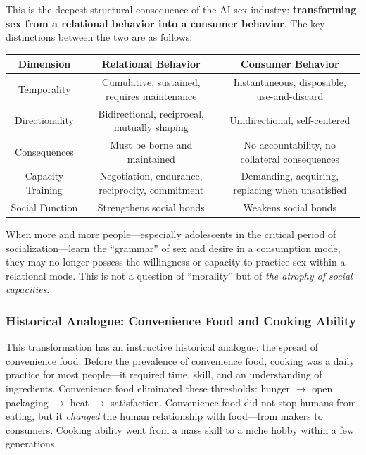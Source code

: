 ﻿\documentclass[12pt,a4paper]{article}
\begin{document}
This is the deepest structural consequence of the AI sex industry: \textbf{transforming sex from a relational behavior into a consumer behavior}. The key distinctions between the two are as follows:

\begin{center}
\begin{tabular}{c|c|c}
\hline
\textbf{Dimension} & \textbf{Relational Behavior} & \textbf{Consumer Behavior} \\
\hline
Temporality & Cumulative, sustained, requires maintenance & Instantaneous, disposable, use-and-discard \\
Directionality & Bidirectional, reciprocal, mutually shaping & Unidirectional, self-centered \\
Consequences & Must be borne and maintained & No accountability, no collateral consequences \\
Capacity Training & Negotiation, endurance, reciprocity, commitment & Demanding, acquiring, replacing when unsatisfied \\
Social Function & Strengthens social bonds & Weakens social bonds \\
\hline
\end{tabular}
\end{center}

When more and more people---especially adolescents in the critical period of socialization---learn the ``grammar'' of sex and desire in a consumption mode, they may no longer possess the willingness or capacity to practice sex within a relational mode. This is not a question of ``morality'' but of \textit{the atrophy of social capacities}.

\subsubsection{Historical Analogue: Convenience Food and Cooking Ability}

This transformation has an instructive historical analogue: the spread of convenience food. Before the prevalence of convenience food, cooking was a daily practice for most people---it required time, skill, and an understanding of ingredients. Convenience food eliminated these thresholds: hunger ${}\to{}$ open packaging ${}\to{}$ heat ${}\to{}$ satisfaction. Convenience food did not stop humans from eating, but it \emph{changed} the human relationship with food---from makers to consumers. Cooking ability went from a mass skill to a niche hobby within a few generations.
\end{document}
